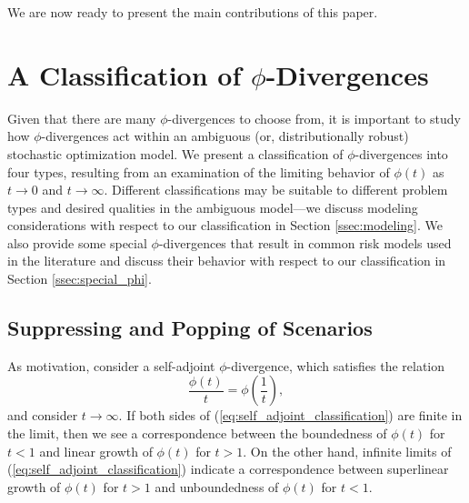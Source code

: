 \documentclass[ijoc,letterpaper]{informs3} %
\begin{document}
We are now ready to present the main contributions of this paper. 

\section{A Classification of $\phi$-Divergences}
\label{sec:classification}

Given that there are many $\phi$-divergences to choose from, it is important to study how $\phi$-divergences act within an ambiguous (or, distributionally robust) stochastic optimization model. 
We present a classification of $\phi$-divergences into four types, resulting from an examination of the limiting behavior of $\phi(t)$ as $t \rightarrow 0$ and $t \rightarrow \infty$.
Different classifications may be suitable to different problem types and desired qualities in the ambiguous model---we discuss modeling considerations with respect to our classification in Section \ref{ssec:modeling}.
We also provide some special $\phi$-divergences that result in common risk models used in the literature and discuss their behavior with respect to our classification in Section \ref{ssec:special_phi}.

\subsection{Suppressing and Popping of Scenarios}
\label{ssec:suppressandpop}

As motivation, consider a self-adjoint $\phi$-divergence, which satisfies the relation
\begin{equation} \label{eq:self_adjoint_classification}
	\frac{\phi(t)}{t} = \phi\left(\frac{1}{t}\right),
\end{equation}
and consider $t \rightarrow \infty$.
If both sides of (\ref{eq:self_adjoint_classification}) are finite in the limit, then we see a correspondence between the boundedness of $\phi(t)$ for $t < 1$ and linear growth of $\phi(t)$ for $t > 1$.
On the other hand, infinite limits of (\ref{eq:self_adjoint_classification}) indicate a correspondence between superlinear growth of $\phi(t)$ for $t > 1$ and unboundedness of $\phi(t)$ for $t < 1$.
\end{document}
